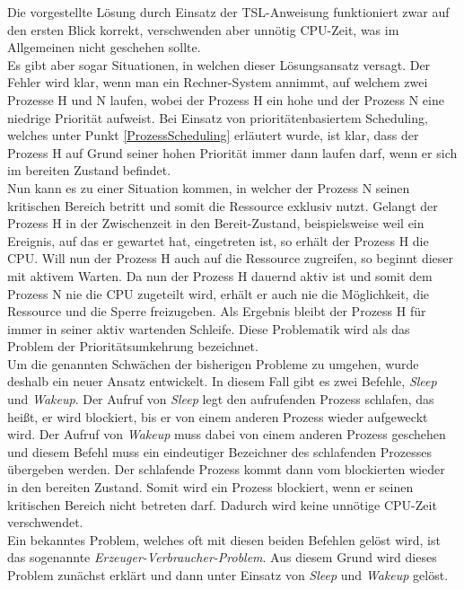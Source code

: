 \begin{description}
						Die vorgestellte Lösung durch Einsatz der TSL-Anweisung funktioniert zwar auf den ersten Blick korrekt, verschwenden aber unnötig CPU-Zeit, was im Allgemeinen nicht geschehen sollte.\\
						Es gibt aber sogar Situationen, in welchen dieser Lösungsansatz versagt. Der Fehler wird klar, wenn man ein Rechner-System annimmt, auf welchem zwei Prozesse H und N laufen, wobei der Prozess H ein hohe und der Prozess N eine niedrige Priorität aufweist. Bei Einsatz von prioritätenbasiertem Scheduling, welches unter Punkt \ref{ProzessScheduling} erläutert wurde, ist klar, dass der Prozess H auf Grund seiner hohen Priorität immer dann laufen darf, wenn er sich im bereiten Zustand befindet.\\
						Nun kann es zu einer Situation kommen, in welcher der Prozess N seinen kritischen Bereich betritt und somit die Ressource exklusiv nutzt. Gelangt der Prozess H in der Zwischenzeit in den Bereit-Zustand, beispielsweise weil ein Ereignis, auf das er gewartet hat, eingetreten ist, so erhält der Prozess H die CPU. Will nun der Prozess H auch auf die Ressource zugreifen, so beginnt dieser mit aktivem Warten. Da nun der Prozess H dauernd aktiv ist und somit dem Prozess N nie die CPU zugeteilt wird, erhält er auch nie die Möglichkeit, die Ressource und die Sperre freizugeben. Als Ergebnis bleibt der Prozess H für immer in seiner aktiv wartenden Schleife. Diese Problematik wird als das Problem der Prioritätsumkehrung bezeichnet.\\
						Um die genannten Schwächen der bisherigen Probleme zu umgehen, wurde deshalb ein neuer Ansatz entwickelt. In diesem Fall gibt es zwei Befehle, \textit{Sleep} und \textit{Wakeup}. Der Aufruf von \textit{Sleep} legt den aufrufenden Prozess schlafen, das heißt, er wird blockiert, bis er von einem anderen Prozess wieder aufgeweckt wird. Der Aufruf von \textit{Wakeup} muss dabei von einem anderen Prozess geschehen und diesem Befehl muss ein eindeutiger Bezeichner des schlafenden Prozesses übergeben werden. Der schlafende Prozess kommt dann vom blockierten wieder in den bereiten Zustand. Somit wird ein Prozess blockiert, wenn er seinen kritischen Bereich nicht betreten darf. Dadurch wird keine unnötige CPU-Zeit verschwendet.\\
						Ein bekanntes Problem, welches oft mit diesen beiden Befehlen gelöst wird, ist das sogenannte \textit{Erzeuger-Verbraucher-Problem}. Aus diesem Grund wird dieses Problem zunächst erklärt und dann unter Einsatz von \textit{Sleep} und \textit{Wakeup} gelöst. \cite{ModerneBetriebssysteme}
						

\end{description}
